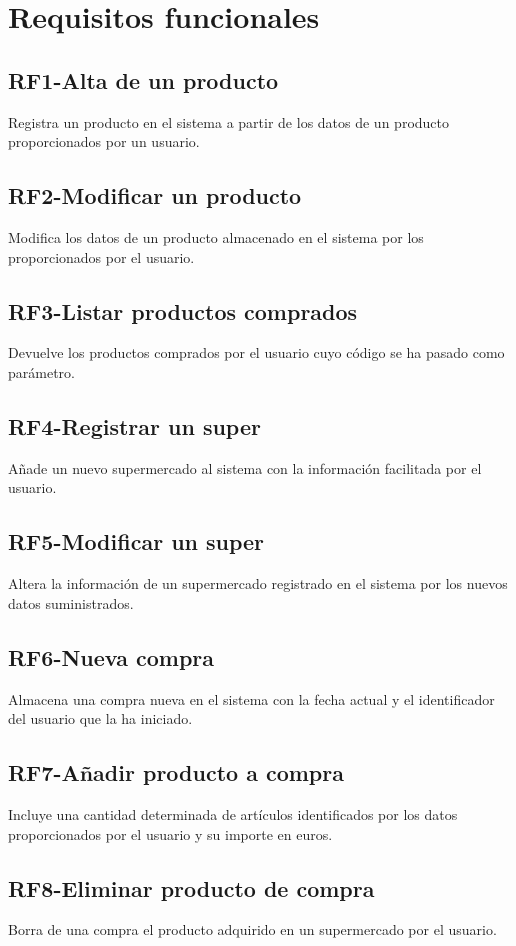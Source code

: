 \documentclass[a4paper,12pt]{report}
\begin{document}
\section{Requisitos funcionales}
\label{sec-2-2}
\subsection{\textbf{RF1-Alta de un producto}}
\label{sec-2-2-1}
Registra un producto en el sistema a partir de los datos de un producto proporcionados por un usuario.
\subsection{\textbf{RF2-Modificar un producto}}
\label{sec-2-2-2}
Modifica los datos de un producto almacenado en el sistema por los proporcionados por el usuario.
\subsection{\textbf{RF3-Listar productos comprados}}
\label{sec-2-2-3}
Devuelve los productos comprados por el usuario cuyo código se ha pasado como parámetro.
\subsection{\textbf{RF4-Registrar un super}}
\label{sec-2-2-4}
Añade un nuevo supermercado al sistema con la información facilitada por el usuario.
\subsection{\textbf{RF5-Modificar un super}}
\label{sec-2-2-5}
Altera la información de un supermercado registrado en el sistema por los nuevos datos suministrados.
\subsection{\textbf{RF6-Nueva compra}}
\label{sec-2-2-6}
Almacena una compra nueva en el sistema con la fecha actual y el identificador del usuario que la ha iniciado.
\subsection{\textbf{RF7-Añadir producto a compra}}
\label{sec-2-2-7}
Incluye una cantidad determinada de artículos identificados por los datos proporcionados por el usuario y su importe en euros.
\subsection{\textbf{RF8-Eliminar producto de compra}}
\label{sec-2-2-8}
Borra de una compra el producto adquirido en un supermercado  por el usuario.
\end{document}
